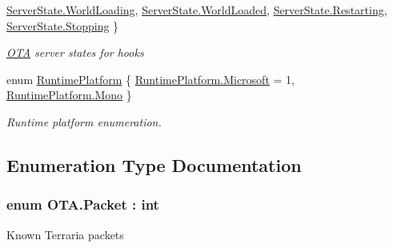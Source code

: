 \begin{DoxyCompactItemize}
\hyperlink{namespace_o_t_a_ab97ab16dfa3c2e92e2f3b2342ea84bd0a44e5df8f74f3e704bd6a29e641e43e0c}{Server\+State.\+World\+Loading}, 
\hyperlink{namespace_o_t_a_ab97ab16dfa3c2e92e2f3b2342ea84bd0af793e34b9f8de6f9ee6f0babcc44e7e8}{Server\+State.\+World\+Loaded}, 
\hyperlink{namespace_o_t_a_ab97ab16dfa3c2e92e2f3b2342ea84bd0a431dc808fe209d3c3e812991b46d40ef}{Server\+State.\+Restarting}, 
\hyperlink{namespace_o_t_a_ab97ab16dfa3c2e92e2f3b2342ea84bd0a7b7ecb39b9e110c2a31409a1672bad23}{Server\+State.\+Stopping}
 \}\begin{DoxyCompactList}\small\item\em \hyperlink{namespace_o_t_a}{O\+T\+A} server states for hooks \end{DoxyCompactList}
\item 
enum \hyperlink{namespace_o_t_a_a2c20c57ecb3e2cb3e3bb8e73eff5cdb4}{Runtime\+Platform} \{ \hyperlink{namespace_o_t_a_a2c20c57ecb3e2cb3e3bb8e73eff5cdb4a140864078aeca1c7c35b4beb33c53c34}{Runtime\+Platform.\+Microsoft} = 1, 
\hyperlink{namespace_o_t_a_a2c20c57ecb3e2cb3e3bb8e73eff5cdb4a5d9b47bd3b65072e0d5daf55f01da086}{Runtime\+Platform.\+Mono}
 \}\begin{DoxyCompactList}\small\item\em Runtime platform enumeration. \end{DoxyCompactList}
\end{DoxyCompactItemize}


\subsection{Enumeration Type Documentation}
\hypertarget{namespace_o_t_a_a77ae6c8a87d7ca2999a6f5a97f90f46d}{}
\subsubsection[{Packet}]{\setlength{\rightskip}{0pt plus 5cm}enum {\bf O\+T\+A.\+Packet} \+: int\hspace{0.3cm}{\ttfamily [strong]}}\label{namespace_o_t_a_a77ae6c8a87d7ca2999a6f5a97f90f46d}


Known Terraria packets 

